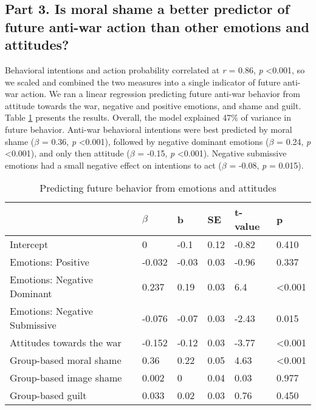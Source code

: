 \documentclass[
]{article}
\begin{document}
\hypertarget{part-3.-is-moral-shame-a-better-predictor-of-future-anti-war-action-than-other-emotions-and-attitudes}{%
\subsection*{Part 3. Is moral shame a better predictor of future anti-war action than other emotions and attitudes?}\label{part-3.-is-moral-shame-a-better-predictor-of-future-anti-war-action-than-other-emotions-and-attitudes}}

Behavioral intentions and action probability correlated at \emph{r} = 0.86, \emph{p} \textless0.001, so we scaled and combined the two measures into a single indicator of future anti-war action. We ran a linear regression predicting future anti-war behavior from attitude towards the war, negative and positive emotions, and shame and guilt. Table \ref{tab:Table3} presents the results. Overall, the model explained 47\% of variance in future behavior. Anti-war behavioral intentions were best predicted by moral shame (\(\beta\) = 0.36, \emph{p} \textless0.001), followed by negative dominant emotions (\(\beta\) = 0.24, \emph{p} \textless0.001), and only then attitude (\(\beta\) = -0.15, \emph{p} \textless0.001). Negative submissive emotions had a small negative effect on intentions to act (\(\beta\) = -0.08, \emph{p} = 0.015).

\begin{table}[H]

\caption{\label{tab:Table3}Predicting future behavior from emotions and attitudes
}
\centering
\fontsize{8}{10}\selectfont
\begin{tabular}[t]{llllll}
\toprule
  & $\beta$ & b & SE & t-value & p\\
\midrule
Intercept & 0 & -0.1 & 0.12 & -0.82 & 0.410\\
Emotions: Positive & -0.032 & -0.03 & 0.03 & -0.96 & 0.337\\
Emotions: Negative Dominant & 0.237 & 0.19 & 0.03 & 6.4 & <0.001\\
Emotions: Negative Submissive & -0.076 & -0.07 & 0.03 & -2.43 & 0.015\\
Attitudes towards the war & -0.152 & -0.12 & 0.03 & -3.77 & <0.001\\
\addlinespace
Group-based moral shame & 0.36 & 0.22 & 0.05 & 4.63 & <0.001\\
Group-based image shame & 0.002 & 0 & 0.04 & 0.03 & 0.977\\
Group-based guilt & 0.033 & 0.02 & 0.03 & 0.76 & 0.450\\
\bottomrule
\end{tabular}
\end{table}
\end{document}
